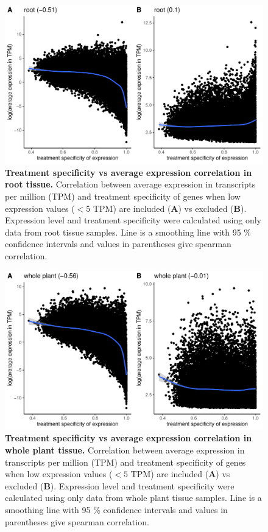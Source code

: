 \documentclass[12pt]{article}
\begin{document}
\begin{figure}[H]
\centering
\includegraphics[width = \linewidth]{figures/appendix_a/root_treatmentSpecificityVsAverageExpression_withVsWithoutZeros.pdf}
\caption{\textbf{Treatment specificity vs average expression correlation in root tissue.} Correlation between average expression in transcripts per million (TPM) and treatment specificity of genes when low expression values ($< 5$ TPM) are included (\textbf{A}) vs excluded (\textbf{B}). Expression level and treatment specificity were calculated using only data from root tissue samples. Line is a smoothing line with 95 \% confidence intervals and values in parentheses give spearman correlation.}%
\end{figure}

\begin{figure}[H]
\centering
\includegraphics[width = \linewidth]{figures/appendix_a/plant_treatmentSpecificityVsAverageExpression_withVsWithoutZeros.pdf}
\caption{\textbf{Treatment specificity vs average expression correlation in whole plant tissue.} Correlation between average expression in transcripts per million (TPM) and treatment specificity of genes when low expression values ($< 5$ TPM) are included (\textbf{A}) vs excluded (\textbf{B}). Expression level and treatment specificity were calculated using only data from whole plant tissue samples. Line is a smoothing line with 95 \% confidence intervals and values in parentheses give spearman correlation.}%
\end{figure}
\end{document}
